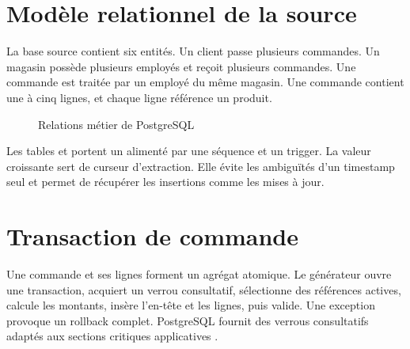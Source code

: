 \section{Modèle relationnel de la source}
La base source contient six entités. Un client passe plusieurs commandes. Un magasin possède plusieurs employés et reçoit plusieurs commandes. Une commande est traitée par un employé du même magasin. Une commande contient une à cinq lignes, et chaque ligne référence un produit.

\begin{figure}[htbp]
\centering
{}
\caption{Relations métier de PostgreSQL}
\label{fig:source-model}
\end{figure}

Les tables  et  portent un  alimenté par une séquence et un trigger. La valeur croissante sert de curseur d'extraction. Elle évite les ambiguïtés d'un timestamp seul et permet de récupérer les insertions comme les mises à jour.

\section{Transaction de commande}
Une commande et ses lignes forment un agrégat atomique. Le générateur ouvre une transaction, acquiert un verrou consultatif, sélectionne des références actives, calcule les montants, insère l'en-tête et les lignes, puis valide. Une exception provoque un rollback complet. PostgreSQL fournit des verrous consultatifs adaptés aux sections critiques applicatives \cite{postgres-locks}.

